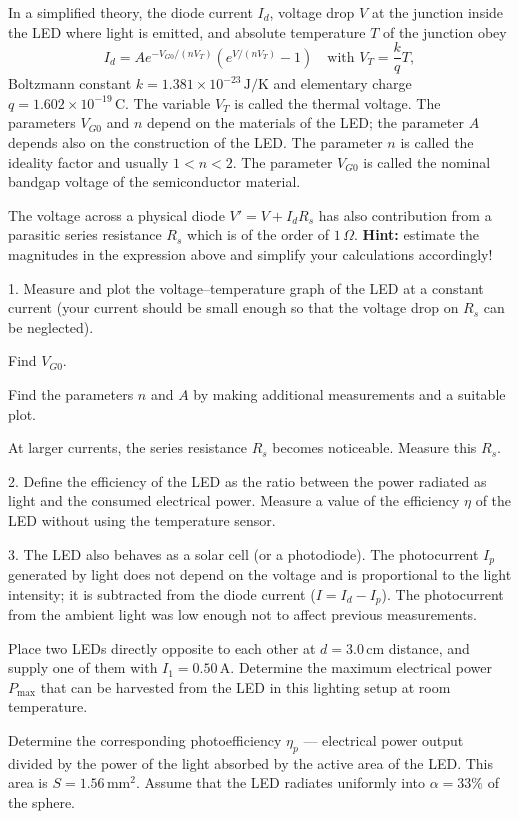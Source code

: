 In a simplified theory, the diode current $I_d$, voltage drop $V$ at the
junction inside the LED where light is emitted, and absolute temperature $T$ of
the junction obey
\[
I_d = Ae^{-V_{G0}/(nV_T)}\left(e^{V/(nV_T)} - 1\right) \quad \text{with } V_T = \frac{k}{q}T,
\]
Boltzmann constant $k = 1.381 \times 10^{-23}\,\mathrm{J/K}$ and elementary
charge $q = 1.602 \times 10^{-19}\,\mathrm{C}$. The variable $V_T$ is called
the thermal voltage. The parameters $V_{G0}$ and $n$ depend on the materials of
the LED; the parameter $A$ depends also on the construction of the LED. The
parameter $n$ is called the ideality factor and usually $1 < n < 2$. The
parameter $V_{G0}$ is called the nominal bandgap voltage of the semiconductor
material.

The voltage across a physical diode $V' = V + I_dR_s$ has also contribution
from a parasitic series resistance $R_s$ which is of the order of
$1\,\Omega$. \textbf{Hint:} estimate the magnitudes in the expression above and
simplify your calculations accordingly!

1. Measure and plot the voltage--temperature graph of the LED at a constant
current (your current should be small enough so that the voltage drop on $R_s$
can be neglected).

Find $V_{G0}$.

Find the parameters $n$ and $A$ by making additional measurements and a
suitable plot.

At larger currents, the series resistance $R_s$ becomes noticeable. Measure
this $R_s$.

2. Define the efficiency of the LED as the ratio between the power radiated as
light and the consumed electrical power. Measure a value of the efficiency
$\eta$ of the LED without using the temperature sensor.

3. The LED also behaves as a solar cell (or a photodiode). The photocurrent
$I_p$ generated by light does not depend on the voltage and is proportional to
the light intensity; it is subtracted from the diode current
($I = I_d - I_p$). The photocurrent from the ambient light was low enough not
to affect previous measurements.

Place two LEDs directly opposite to each other at $d = 3.0\,\mathrm{cm}$
distance, and supply one of them with $I_1 = 0.50\,\mathrm{A}$. Determine the
maximum electrical power $P_{\mathrm{max}}$ that can be harvested from the LED
in this lighting setup at room temperature.

Determine the corresponding photoefficiency $\eta_p$ --- electrical power
output divided by the power of the light absorbed by the active area of the
LED. This area is $S = 1.56\,\mathrm{mm}^2$. Assume that the LED radiates
uniformly into $\alpha = 33\%$ of the sphere.
